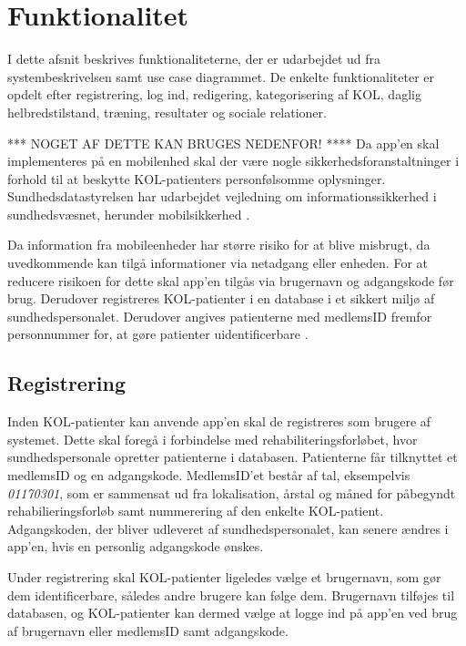 \section{Funktionalitet}
I dette afsnit beskrives funktionaliteterne, der er udarbejdet ud fra systembeskrivelsen samt use case diagrammet. De enkelte funktionaliteter er opdelt efter registrering, log ind, redigering, kategorisering af KOL, daglig helbredstilstand, træning, resultater og sociale relationer. 





*** NOGET AF DETTE KAN BRUGES NEDENFOR! ****
Da app'en skal implementeres på en mobilenhed skal der være nogle sikkerhedsforanstaltninger i forhold til at beskytte KOL-patienters personfølsomme oplysninger. Sundhedsdatastyrelsen har udarbejdet vejledning om informationssikkerhed i sundhedsvæsnet, herunder mobilsikkerhed \cite{Sundhedsdatastyrelsen2016}.

Da information fra mobileenheder har større risiko for at blive misbrugt, da uvedkommende kan tilgå informationer via netadgang eller enheden. For at reducere risikoen for dette skal app'en tilgås via brugernavn og adgangskode før brug. Derudover registreres KOL-patienter i en database i et sikkert miljø af sundhedspersonalet. Derudover angives patienterne med medlemsID fremfor personnummer for, at gøre patienter uidentificerbare \cite{Sundhedsdatastyrelsen2016}. 

\subsection*{Registrering} \label{sec:registrering}
Inden KOL-patienter kan anvende app'en skal de registreres som brugere af systemet. Dette skal foregå i forbindelse med rehabiliteringsforløbet, hvor sundhedspersonale opretter patienterne i databasen. Patienterne får tilknyttet et medlemsID og en adgangskode. MedlemsID'et består af tal, eksempelvis \textit{01170301}, som er sammensat ud fra lokalisation, årstal og måned for påbegyndt rehabilieringsforløb samt nummerering af den enkelte KOL-patient.
Adgangskoden, der bliver udleveret af sundhedspersonalet, kan senere ændres i app'en, hvis en personlig adgangskode ønskes. 

Under registrering skal KOL-patienter ligeledes vælge et brugernavn, som gør dem identificerbare, således andre brugere kan følge dem. Brugernavn tilføjes til databasen, og KOL-patienter kan dermed vælge at logge ind på app'en ved brug af brugernavn eller  medlemsID samt adgangskode. 

